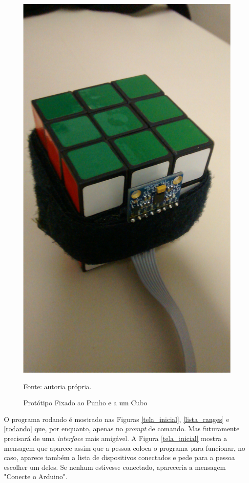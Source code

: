 \begin{figure}[h]
	 		\includegraphics[keepaspectratio=true,scale=0.1]{figuras/prototipo_2_3.jpg}
	 		\caption{Protótipo Fixado ao Punho e a um Cubo}
	 		Fonte: autoria própria. 
	 		\label{prototipo3}	
	 	\end{figure}
	 
	O programa rodando é mostrado nas Figuras \ref{tela_inicial}, \ref{lista_ranges} e \ref{rodando} que, por enquanto, apenas no \textit{prompt} de comando. Mas futuramente precisará de uma \textit{interface} mais amigável. A Figura \ref{tela_inicial} mostra a mensagem que aparece assim que a pessoa coloca o programa para funcionar, no caso, aparece também a lista de dispositivos conectados e pede para a pessoa escolher um deles. Se nenhum estivesse conectado, apareceria a mensagem "Conecte o Arduino".
	
